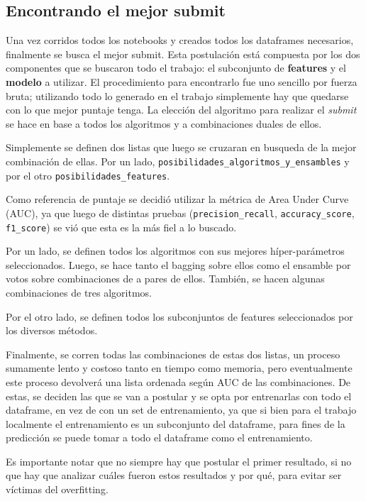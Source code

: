 \documentclass[a4paper]{article}
\begin{document}
\subsection{Encontrando el mejor submit}

Una vez corridos todos los notebooks y creados todos los dataframes necesarios, finalmente se busca el mejor submit. Esta postulación está compuesta por los dos componentes que se buscaron todo el trabajo: el subconjunto de \textbf{features} y el \textbf{modelo} a utilizar. El procedimiento para encontrarlo fue uno sencillo por fuerza bruta; utilizando todo lo generado en el trabajo simplemente hay que quedarse con lo que mejor puntaje tenga. La elección del algoritmo para realizar el \textit{submit} se hace en base a todos los algoritmos y a combinaciones duales de ellos.

Simplemente se definen dos listas que luego se cruzaran en busqueda de la mejor combinación de ellas. Por un lado, \texttt{posibilidades\_algoritmos\_y\_ensambles} y por el otro \texttt{posibilidades\_features}.

Como referencia de puntaje se decidió utilizar la métrica de Area Under Curve (AUC), ya que luego de distintas pruebas (\texttt{precision\_recall}, \texttt{accuracy\_score}, \texttt{f1\_score}) se vió que esta es la más fiel a lo buscado.

Por un lado, se definen todos los algoritmos con sus mejores híper-parámetros seleccionados. Luego, se hace tanto el bagging sobre ellos como el ensamble por votos sobre combinaciones de a pares de ellos. También, se hacen algunas combinaciones de tres algoritmos.

Por el otro lado, se definen todos los subconjuntos de features seleccionados por los diversos métodos.

Finalmente, se corren todas las combinaciones de estas dos listas, un proceso sumamente lento y costoso tanto en tiempo como memoria, pero eventualmente este proceso devolverá una lista ordenada según AUC de las combinaciones. De estas, se deciden las que se van a postular y se opta por entrenarlas con todo el dataframe, en vez de con un set de entrenamiento, ya que si bien para el trabajo localmente el entrenamiento es un subconjunto del dataframe, para fines de la predicción se puede tomar a todo el dataframe como el entrenamiento.

Es importante notar que no siempre hay que postular el primer resultado, si no que hay que analizar cuáles fueron estos resultados y por qué, para evitar ser víctimas del overfitting. 
\end{document}
